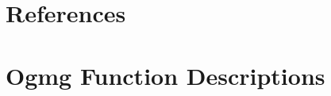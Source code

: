 \documentclass[12pt]{article}
\begin{document}
\clearpage




\clearpage
\section{References}



\clearpage
\section{Ogmg Function Descriptions}





\printindex
\end{document}
